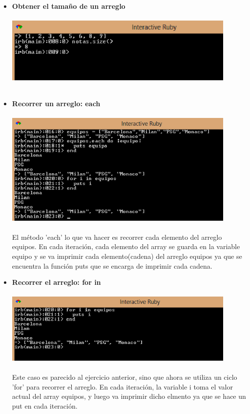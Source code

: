 \documentclass[11pt]{article} %
\begin{document}
\begin{itemize}
    \item  {\bf Obtener el tamaño de un arreglo}\\\\
        \includegraphics[width=0.9\textwidth]{./imagenes/SizeArreglo}\\\\
\newpage

     \item  {\bf Recorrer un arreglo: each}\\\\
        \includegraphics[width=0.9\textwidth]{./imagenes/RecorrerArregloEach}\\\\
     El método 'each' lo que va hacer es recorrer cada elemento del arreglo equipos. En cada iteración, cada elemento del array se guarda en la variable equipo y se va imprimir cada elemento(cadena) del arreglo equipos ya que se encuentra la función puts que se encarga de imprimir cada cadena.\\

	

     \item {\bf Recorrer el arreglo: for in}\\\\

	    \includegraphics[width=0.9\textwidth]{./imagenes/RecorridoForin}\\\\
     Este caso es parecido al ejercicio anterior, sino que ahora se utiliza un ciclo 'for' para recorrer el arreglo. En cada iteración, la variable i toma el valor actual del array equipos, y luego va imprimir dicho elmento ya que se hace un put en cada iteración.\\
\newpage


\end{itemize}
\end{document}
